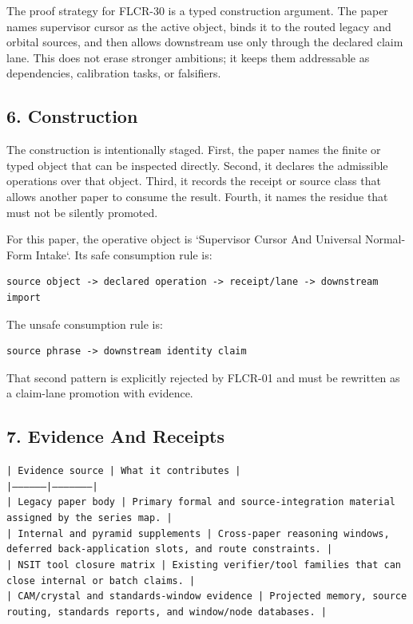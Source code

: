 \documentclass[11pt]{article}
\begin{document}
The proof strategy for FLCR-30 is a typed construction argument. The paper names supervisor cursor as the active object, binds it to the routed legacy and orbital sources, and then allows downstream use only through the declared claim lane. This does not erase stronger ambitions; it keeps them addressable as dependencies, calibration tasks, or falsifiers.

\subsection*{6. Construction}

The construction is intentionally staged. First, the paper names the finite or
typed object that can be inspected directly. Second, it declares the admissible
operations over that object. Third, it records the receipt or source class that
allows another paper to consume the result. Fourth, it names the residue that
must not be silently promoted.

For this paper, the operative object is `Supervisor Cursor And Universal Normal-Form Intake`. Its safe consumption
rule is:

\begin{verbatim}
source object -> declared operation -> receipt/lane -> downstream import
\end{verbatim}

The unsafe consumption rule is:

\begin{verbatim}
source phrase -> downstream identity claim
\end{verbatim}

That second pattern is explicitly rejected by FLCR-01 and must be rewritten as
a claim-lane promotion with evidence.

\subsection*{7. Evidence And Receipts}

\noindent\texttt{| Evidence source | What it contributes |}\\
\noindent\texttt{|-----------------|---------------------|}\\
\noindent\texttt{| Legacy paper body | Primary formal and source-integration material assigned by the series map. |}\\
\noindent\texttt{| Internal and pyramid supplements | Cross-paper reasoning windows, deferred back-application slots, and route constraints. |}\\
\noindent\texttt{| NSIT tool closure matrix | Existing verifier/tool families that can close internal or batch claims. |}\\
\noindent\texttt{| CAM/crystal and standards-window evidence | Projected memory, source routing, standards reports, and window/node databases. |}\\
\end{document}
